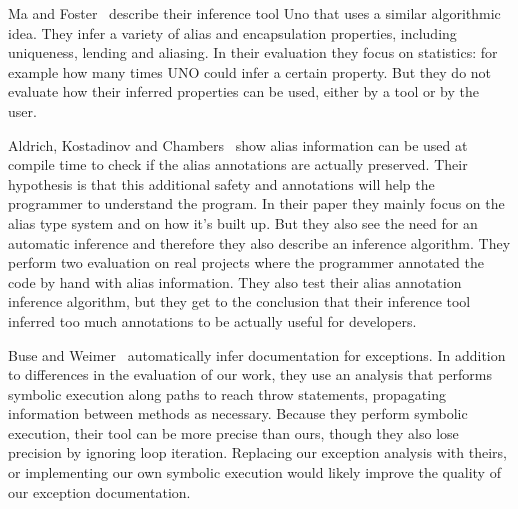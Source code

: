Ma and Foster~\cite{Uno} describe their inference tool Uno that uses a similar
algorithmic idea. They infer a variety of alias and encapsulation
properties, including uniqueness, lending and aliasing. In their evaluation
they focus on statistics: for example how many times UNO could infer a certain property.
But they do not evaluate how their inferred properties can be used, either by a tool
or by the user.

Aldrich, Kostadinov and Chambers~\cite{AliasJava} show alias information 
can be used at compile time to check if the alias annotations are actually
preserved. Their hypothesis is that this additional safety and annotations will
help the programmer to understand the program. In their paper they mainly focus
on the alias type system and on how it's built up. But they also see the need
for an automatic inference and therefore they also describe an inference algorithm.
They perform two evaluation on real projects where the programmer
annotated the code by hand with alias information. They also test their
alias annotation inference algorithm, but they get to the conclusion that
their inference tool inferred too much annotations to be actually useful
for developers.

Buse and Weimer~\cite{autodoc} automatically infer documentation for
exceptions.  In addition to differences in the evaluation of our work, they use
an analysis that performs symbolic execution along paths to reach throw
statements, propagating information between methods as necessary.
Because they
perform symbolic execution, their tool can be more precise than ours, though
they also lose precision by ignoring loop iteration.
Replacing our exception analysis with theirs, or implementing our own symbolic
execution would likely improve the quality of our exception documentation.
